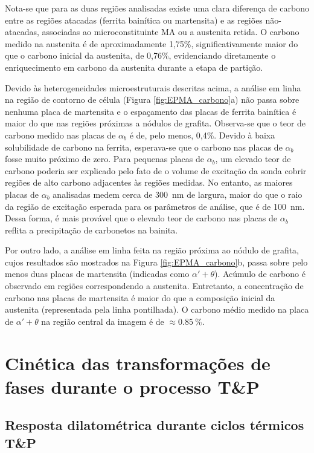 Nota-se que para as duas regiões analisadas existe uma clara diferença de carbono entre as regiões atacadas (ferrita bainítica ou martensita) e as regiões não-atacadas, associadas ao microconstituinte MA ou a austenita retida. O carbono medido na austenita é de aproximadamente 1,75\%, significativamente maior do que o carbono inicial da austenita, de 0,76\%, evidenciando diretamente o enriquecimento em carbono da austenita durante a etapa de partição. 

Devido às heterogeneidades microestruturais descritas acima, a análise em linha na região de contorno de célula (Figura \ref{fig:EPMA_carbono}a) não passa sobre nenhuma placa de martensita e o espaçamento das placas de ferrita bainítica é maior do que nas regiões próximas a nódulos de grafita. Observa-se que o teor de carbono medido nas placas de $\alpha_b$ é de, pelo menos, 0,4\%. Devido à baixa solubilidade de carbono na ferrita, esperava-se que o carbono nas placas de $\alpha_b$ fosse muito próximo de zero. Para pequenas placas de $\alpha_b$, um elevado teor de carbono poderia ser explicado pelo fato de o volume de excitação da sonda cobrir regiões de alto carbono adjacentes às regiões medidas. No entanto, as maiores placas de $\alpha_b$ analisadas medem cerca de \SI{300}{nm} de largura, maior do que o raio da região de excitação esperada para os parâmetros de análise, que é de \SI{100}{nm}. Dessa forma, é mais provável que o elevado teor de carbono nas placas de $\alpha_b$ reflita a precipitação de carbonetos na bainita.

Por outro lado, a análise em linha feita na região próxima ao nódulo de grafita, cujos resultados são mostrados na Figura \ref{fig:EPMA_carbono}b, passa sobre pelo menos duas placas de martensita (indicadas como $\alpha' + \theta$). Acúmulo de carbono é observado em regiões correspondendo a austenita. Entretanto, a concentração de carbono nas placas de martensita é maior do que a composição inicial da austenita (representada pela linha pontilhada). O carbono médio medido na placa de $\alpha' + \theta$ na região central da imagem é de $\approx \SI{0.85}{\%}$.


\section{Cinética das transformações de fases durante o processo T\&P}

\label{sec:cinetica}

\subsection{Resposta dilatométrica durante ciclos térmicos T\&P}

